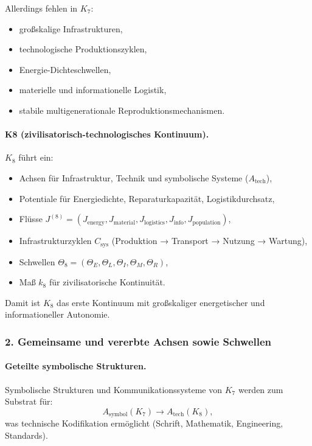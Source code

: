 Allerdings fehlen in $K_7$:
\begin{itemize}
  \item großskalige Infrastrukturen,
  \item technologische Produktionszyklen,
  \item Energie-Dichteschwellen,
  \item materielle und informationelle Logistik,
  \item stabile multigenerationale Reproduktionsmechanismen.
\end{itemize}

\paragraph{K8 (zivilisatorisch-technologisches Kontinuum).}
$K_8$ führt ein:
\begin{itemize}
  \item Achsen für Infrastruktur, Technik und symbolische Systeme ($A_{\mathrm{tech}}$),
  \item Potentiale für Energiedichte, Reparaturkapazität, Logistikdurchsatz,
  \item Flüsse $J^{(8)} = (J_{\mathrm{energy}}, J_{\mathrm{material}},
        J_{\mathrm{logistics}}, J_{\mathrm{info}}, J_{\mathrm{population}})$,
  \item Infrastrukturzyklen $C_{\mathrm{sys}}$ (Produktion → Transport → Nutzung → Wartung),
  \item Schwellen $\Theta_8 = (\Theta_E, \Theta_L, \Theta_I, \Theta_M, \Theta_R)$,
  \item Maß $k_8$ für zivilisatorische Kontinuität.
\end{itemize}

Damit ist $K_8$ das erste Kontinuum mit großskaliger energetischer und
informationeller Autonomie.

\subsubsection{2. Gemeinsame und vererbte Achsen sowie Schwellen}

\paragraph{Geteilte symbolische Strukturen.}
Symbolische Strukturen und Kommunikationssysteme von $K_7$ werden zum Substrat für:
\[
A_{\mathrm{symbol}}(K_7) \rightarrow A_{\mathrm{tech}}(K_8),
\]
was technische Kodifikation ermöglicht (Schrift, Mathematik, Engineering,
Standards).

